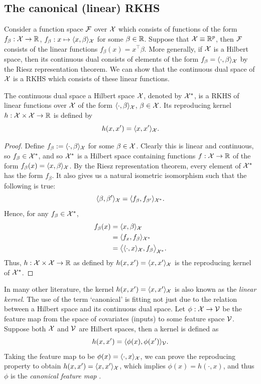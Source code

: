 \subsection{The canonical (linear) RKHS}

Consider a function space ${\mathcal F}$ over ${\mathcal X}$ which consists of functions of the form $f_\beta:{\mathcal X}\to\mathbb{R}$, $f_\beta: x \mapsto \langle x,\beta\rangle_{\mathcal X}$ for some $\beta\in\mathbb{R}$.
Suppose that ${\mathcal X} \equiv \mathbb{R}^p$, then ${\mathcal F}$ consists of the linear functions $f_\beta(x) = x^\top\beta$.
More generally, if ${\mathcal X}$ is a Hilbert space, then its continuous dual consists of elements of the form $f_\beta = \langle\cdot,\beta\rangle_{\mathcal X}$ by the Riesz representation theorem.
We can show that the continuous dual space of ${\mathcal X}$ is a RKHS which consists of these linear functions.

\begin{proposition}
  The continuous dual space a Hilbert space ${\mathcal X}$, denoted by ${\mathcal X}^*$, is a RKHS of linear functions over ${\mathcal X}$ of the form $\langle\cdot,\beta\rangle_{\mathcal X}$, $\beta\in{\mathcal X}$. Its reproducing kernel $h:{\mathcal X}\times{\mathcal X}\to\mathbb{R}$ is defined by
  \[
    h(x,x') = \langle x,x'\rangle_{{\mathcal X}}.
  \]
\end{proposition}

\begin{proof}
  Define $f_\beta := \langle\cdot,\beta\rangle_{\mathcal X}$ for some $\beta \in {\mathcal X}$.
  Clearly this is linear and continuous, so $f_\beta\in{\mathcal X}^*$, and so ${\mathcal X}^*$ is a Hilbert space containing functions $f:{\mathcal X}\to\mathbb{R}$ of the form $f_\beta(x) = \langle x,\beta\rangle_{\mathcal X}$.
  By the Riesz representation theorem, every element of ${\mathcal X}^*$ has the form $f_\beta$.
  It also gives us a natural isometric isomorphism such that the following is true:
  \[
    \langle\beta,\beta'\rangle_{\mathcal X} = \langle f_\beta,f_{\beta'}\rangle_{{\mathcal X}^*}.
  \]
  Hence, for any $f_\beta\in{\mathcal X}^*$, 
  \vspace{-0.5em}
  \begin{align*}
    f_\beta(x) 
    &= \ip{x,\beta}_\cX \\
    &= \ip{f_x,f_{\beta}}_{\cX^*} \\
    &= \big\langle \ip{\cdot,x}_\cX,f_{\beta} \big\rangle_{\cX^*}. \vspace{-0.5em}
  \end{align*}
  Thus, $h:{\mathcal X}\times{\mathcal X}\to\mathbb{R}$ as defined by $h(x,x') = \langle x,x'\rangle_{\mathcal X}$ is the reproducing kernel of ${\mathcal X}^*$.
\end{proof}

In many other literature, the kernel $h(x,x') = \langle x,x'\rangle_{\mathcal X}$ is also known as the \emph{linear kernel}.
The use of the term `canonical' is fitting not just due to the relation between a Hilbert space and its continuous dual space.
Let $\phi:{\mathcal X}\to{\mathcal V}$ be the feature map from the space of covariates (inputs) to some feature space ${\mathcal V}$.
Suppose both ${\mathcal X}$ and ${\mathcal V}$ are Hilbert spaces, then a kernel is defined as 
\[
  h(x,x') = \langle\phi(x),\phi(x')\rangle_{\mathcal V}.
\]
Taking the feature map to be $\phi(x) = \langle\cdot,x\rangle_{\mathcal X}$, we can prove the reproducing property to obtain $h(x,x') = \langle x,x'\rangle_{\mathcal X}$, which implies $\phi(x) = h(\cdot,x)$, and thus $\phi$ is the \emph{canonical feature map} \citep[Lemma 4.19]{steinwart2008support}.

